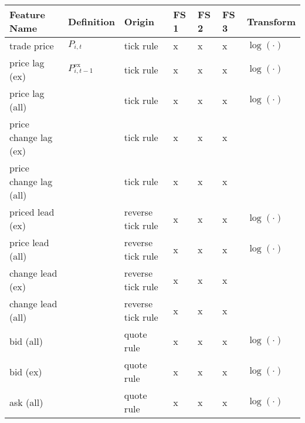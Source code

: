 \begin{tabular}{@{}lllllll@{}}
    \toprule
    Feature Name              & Definition                                                  & Origin    & FS 1 & FS 2 & FS 3 & Transform     \\ \midrule
    trade price               & $P_{i, t}$                                                  & tick rule            & x    & x    & x    & $\log(\cdot)$ \\
    price lag (ex)            & $P_{i, t-1}^{\text{ex}}$                                    & tick rule            & x    & x    & x    & $\log(\cdot)$ \\
    price lag (all)           &                                                             & tick rule            & x    & x    & x    & $\log(\cdot)$ \\
    price change lag (ex)     &                                                             & tick rule            & x    & x    & x    &               \\
    price change lag (all)    &                                                             & tick rule            & x    & x    & x    &               \\
    priced lead (ex)          &                                                             & reverse tick rule    & x    & x    & x    & $\log(\cdot)$ \\
    price lead (all)          &                                                             & reverse tick rule    & x    & x    & x    & $\log(\cdot)$ \\
    change lead (ex)          &                                                             & reverse tick rule    & x    & x    & x    &               \\
    change lead (all)         &                                                             & reverse tick rule    & x    & x    & x    &               \\
    bid (all)                 &                                                             & quote rule           & x    & x    & x    & $\log(\cdot)$ \\
    bid (ex)                  &                                                             & quote rule           & x    & x    & x    & $\log(\cdot)$ \\
    ask (all)                 &                                                             & quote rule           & x    & x    & x    & $\log(\cdot)$ \\

\end{tabular}
